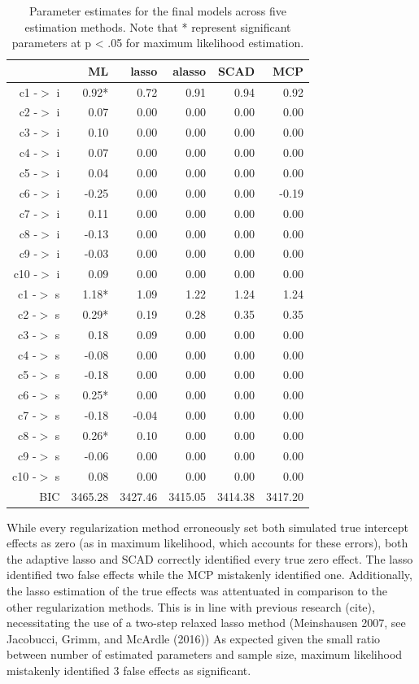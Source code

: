 \documentclass[article]{jss}
\begin{document}
\begin{table}[ht]
\centering
\begin{tabular}{rrrrrr}
  \hline
 & ML & lasso & alasso & SCAD & MCP \\ 
  \hline
c1 -$>$ i & 0.92* & 0.72 & 0.91 & 0.94 & 0.92 \\ 
  c2 -$>$ i & 0.07 & 0.00 & 0.00 & 0.00 & 0.00 \\ 
  c3 -$>$ i & 0.10 & 0.00 & 0.00 & 0.00 & 0.00 \\ 
  c4 -$>$ i & 0.07 & 0.00 & 0.00 & 0.00 & 0.00 \\ 
  c5 -$>$ i & 0.04 & 0.00 & 0.00 & 0.00 & 0.00 \\ 
  c6 -$>$ i & -0.25 & 0.00 & 0.00 & 0.00 & -0.19 \\ 
  c7 -$>$ i & 0.11 & 0.00 & 0.00 & 0.00 & 0.00 \\ 
  c8 -$>$ i & -0.13 & 0.00 & 0.00 & 0.00 & 0.00 \\ 
  c9 -$>$ i & -0.03 & 0.00 & 0.00 & 0.00 & 0.00 \\ 
  c10 -$>$ i & 0.09 & 0.00 & 0.00 & 0.00 & 0.00 \\ 
  c1 -$>$ s & 1.18* & 1.09 & 1.22 & 1.24 & 1.24 \\ 
  c2 -$>$ s & 0.29* & 0.19 & 0.28 & 0.35 & 0.35 \\ 
  c3 -$>$ s & 0.18 & 0.09 & 0.00 & 0.00 & 0.00 \\ 
  c4 -$>$ s & -0.08 & 0.00 & 0.00 & 0.00 & 0.00 \\ 
  c5 -$>$ s & -0.18 & 0.00 & 0.00 & 0.00 & 0.00 \\ 
  c6 -$>$ s & 0.25* & 0.00 & 0.00 & 0.00 & 0.00 \\ 
  c7 -$>$ s & -0.18 & -0.04 & 0.00 & 0.00 & 0.00 \\ 
  c8 -$>$ s & 0.26* & 0.10 & 0.00 & 0.00 & 0.00 \\ 
  c9 -$>$ s & -0.06 & 0.00 & 0.00 & 0.00 & 0.00 \\ 
  c10 -$>$ s & 0.08 & 0.00 & 0.00 & 0.00 & 0.00 \\ 
  BIC & 3465.28 & 3427.46 & 3415.05 & 3414.38 & 3417.20 \\ 
   \hline
\end{tabular}
\caption{Parameter estimates for the final models across five estimation methods. Note that * represent significant parameters at p < .05 for maximum likelihood estimation.}
\end{table}

While every regularization method erroneously set both simulated true
intercept effects as zero (as in maximum likelihood, which accounts for
these errors), both the adaptive lasso and SCAD correctly identified
every true zero effect. The lasso identified two false effects while the
MCP mistakenly identified one. Additionally, the lasso estimation of the
true effects was attentuated in comparison to the other regularization
methods. This is in line with previous research (cite), necessitating
the use of a two-step relaxed lasso method (Meinshausen 2007, see
Jacobucci, Grimm, and McArdle (2016)) As expected given the small ratio
between number of estimated parameters and sample size, maximum
likelihood mistakenly identified 3 false effects as significant.
\end{document}
